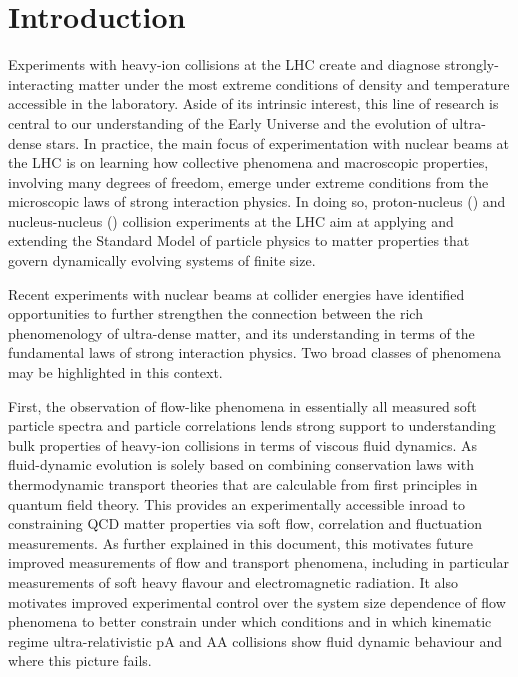 \documentclass[../report.tex]{subfiles}
\begin{document}
\section{Introduction}

Experiments with heavy-ion collisions at the LHC create and diagnose strongly-interacting matter under the most extreme conditions of density and temperature accessible in the laboratory. Aside of its intrinsic interest, this line of research is central to our understanding of the Early Universe and the evolution of ultra-dense stars. In practice, the main focus of experimentation with nuclear beams at the LHC is on learning how collective phenomena and macroscopic properties, involving many degrees of freedom, emerge under extreme conditions from the microscopic laws of strong interaction physics. In doing so, proton-nucleus (\pA) and nucleus-nucleus (\AOnA) collision experiments at the LHC aim at applying and extending the Standard Model of particle physics to matter properties that govern dynamically evolving systems of finite size.

Recent experiments with nuclear beams at collider energies have identified opportunities to further strengthen the connection between the rich phenomenology of ultra-dense matter, and its understanding in terms of the fundamental laws of strong interaction physics. Two broad classes of phenomena may be highlighted in this context.

First, the observation of flow-like phenomena in essentially all measured soft particle spectra and particle correlations lends strong support to understanding bulk properties of heavy-ion collisions in terms of viscous fluid dynamics. As fluid-dynamic evolution is solely based on combining conservation laws with thermodynamic transport theories that are calculable from first principles in quantum field theory. This provides an experimentally accessible inroad to constraining QCD matter properties via soft flow, correlation and fluctuation measurements. As further explained in this document, this motivates future improved measurements of flow and transport phenomena, including in particular measurements of soft heavy flavour and electromagnetic radiation.  It also motivates improved experimental control over the system size dependence of flow phenomena to better constrain under which conditions and in which kinematic regime ultra-relativistic pA and AA collisions show fluid dynamic behaviour and where this picture fails.
\end{document}
